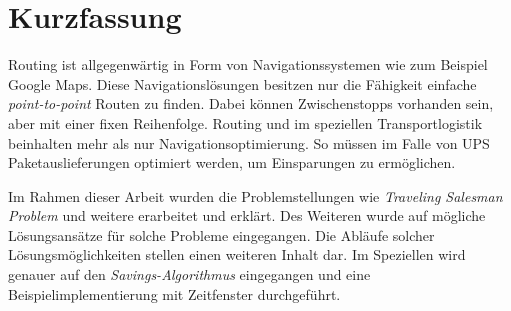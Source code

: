 \chapter{Kurzfassung}

Routing ist allgegenwärtig in Form von Navigationssystemen wie zum Beispiel Google Maps. 
Diese Navigationslösungen besitzen nur die Fähigkeit einfache \textit{point-to-point} Routen zu finden. 
Dabei können Zwischenstopps vorhanden sein, aber mit einer fixen Reihenfolge. 
Routing und im speziellen Transportlogistik beinhalten mehr als nur Navigationsoptimierung. 
So müssen im Falle von UPS Paketauslieferungen optimiert werden, um Einsparungen zu ermöglichen. 

\noindent
Im Rahmen dieser Arbeit wurden die Problemstellungen wie \textit{Traveling Salesman Problem} und weitere erarbeitet und erklärt. 
Des Weiteren wurde auf mögliche Lösungsansätze für solche Probleme eingegangen. 
Die Abläufe solcher Lösungsmöglichkeiten stellen einen weiteren Inhalt dar. 
Im Speziellen wird genauer auf den \textit{Savings-Algorithmus} eingegangen und eine Beispielimplementierung mit Zeitfenster durchgeführt. 